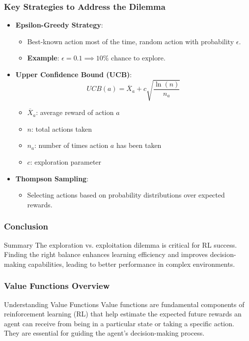 \documentclass{beamer}
\begin{document}
\begin{frame}[fragile]
    \frametitle{Key Strategies to Address the Dilemma}
    \begin{itemize}
        \item \textbf{Epsilon-Greedy Strategy}:
        \begin{itemize}
            \item Best-known action most of the time, random action with probability $\epsilon$.
            \item \textbf{Example}: $\epsilon = 0.1 \implies 10\% \text{ chance to explore.}$
        \end{itemize}
        
        \item \textbf{Upper Confidence Bound (UCB)}:
        \begin{equation}
        UCB(a) = \overline{X}_a + c \sqrt{\frac{\ln(n)}{n_a}}
        \end{equation}
        \begin{itemize}
            \item $\overline{X}_a$: average reward of action $a$
            \item $n$: total actions taken
            \item $n_a$: number of times action $a$ has been taken
            \item $c$: exploration parameter
        \end{itemize}
        
        \item \textbf{Thompson Sampling}:
        \begin{itemize}
            \item Selecting actions based on probability distributions over expected rewards.
        \end{itemize}
    \end{itemize}
\end{frame}

\begin{frame}[fragile]
    \frametitle{Conclusion}
    \begin{block}{Summary}
        The exploration vs. exploitation dilemma is critical for RL success. Finding the right balance enhances learning efficiency and improves decision-making capabilities, leading to better performance in complex environments.
    \end{block}
\end{frame}

\begin{frame}[fragile]
    \frametitle{Value Functions Overview}
    \begin{block}{Understanding Value Functions}
        Value functions are fundamental components of reinforcement learning (RL) that help estimate the expected future rewards an agent can receive from being in a particular state or taking a specific action. They are essential for guiding the agent's decision-making process.
    \end{block}
\end{frame}
\end{document}
